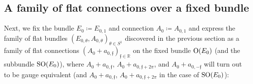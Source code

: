 \documentclass[11pt,a4paper]{scrartcl}
\newcommand{\SO}{\textup{SO}}
\renewcommand{\O}{\textup{O}}
\numberwithin{equation}{section}
\theoremstyle{plain}
\theoremstyle{definition}
\theoremstyle{remark}
\begin{document}
\subsection{A family of flat connections over a fixed bundle}\label{subsec:family of flat connections}

Next, we fix the bundle $E_0 \coloneqq E_{0,1}$ and connection $A_0 \coloneqq A_{0,1}$ and express the family of flat bundles $(E_{0,\theta},A_{0,\theta})_{\theta \in S^1}$ discovered in the previous section as a family of flat connections $(A_0 +a_{0,\mathfrak{f}})_{\mathfrak{f}\in \mathbb{R}} $ on the fixed bundle $\O(E_0)$ (and the subbundle $\SO(E_0)$), where $A_0+a_{0,\mathfrak{f}}$, $A_0+a_{0,\mathfrak{f}+2\pi}$, and $A_0+a_{0,-\mathfrak{f}}$ will turn out to be gauge equivalent (and $A_0+a_{0,\mathfrak{f}}$, $A_0+a_{0,\mathfrak{f}+2\pi}$ in the case of $\SO(E_0)$):
\end{document}
